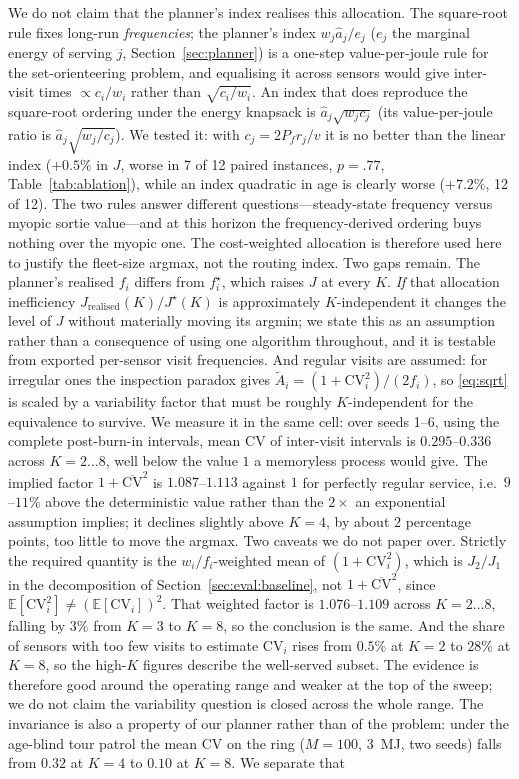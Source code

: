 \documentclass[journal,outdir=./]{IEEEtran}
\newcommand{\Pf}{P_{f}}
\begin{document}
We do not claim that the planner's index realises this allocation. The square-root rule fixes long-run \emph{frequencies}; the planner's index $w_j\hat a_j/e_j$ ($e_j$ the marginal energy of serving $j$, Section~\ref{sec:planner}) is a one-step value-per-joule rule for the set-orienteering problem, and equalising it across sensors would give inter-visit times $\propto c_i/w_i$ rather than $\sqrt{c_i/w_i}$. An index that does reproduce the square-root ordering under the energy knapsack is $\hat a_j\sqrt{w_jc_j}$ (its value-per-joule ratio is $\hat a_j\sqrt{w_j/c_j}$). We tested it: with $c_j=2\Pf r_j/v$ it is no better than the linear index ($+0.5\%$ in $J$, worse in 7 of 12 paired instances, $p=.77$, Table~\ref{tab:ablation}), while an index quadratic in age is clearly worse ($+7.2\%$, 12 of 12). The two rules answer different questions---steady-state frequency versus myopic sortie value---and at this horizon the frequency-derived ordering buys nothing over the myopic one. The cost-weighted allocation is therefore used here to justify the fleet-size argmax, not the routing index. Two gaps remain. The planner's realised $f_i$ differs from $f_i^{\star}$, which raises $J$ at every $K$. \emph{If} that allocation inefficiency $J_{\mathrm{realised}}(K)/J^{\star}(K)$ is approximately $K$-independent it changes the level of $J$ without materially moving its argmin; we state this as an assumption rather than a consequence of using one algorithm throughout, and it is testable from exported per-sensor visit frequencies. And regular visits are assumed: for irregular ones the inspection paradox gives $\tilde A_i=(1+\mathrm{CV}_i^2)/(2f_i)$, so \eqref{eq:sqrt} is scaled by a variability factor that must be roughly $K$-independent for the equivalence to survive. We measure it in the same cell: over seeds 1--6, using the complete post-burn-in intervals, mean $\mathrm{CV}$ of inter-visit intervals is $0.295$--$0.336$ across $K=2\ldots8$, well below the value $1$ a memoryless process would give. The implied factor $1+\overline{\mathrm{CV}}^2$ is $1.087$--$1.113$ against $1$ for perfectly regular service, i.e.\ $9$--$11\%$ above the deterministic value rather than the $2\times$ an exponential assumption implies; it declines slightly above $K=4$, by about $2$ percentage points, too little to move the argmax. Two caveats we do not paper over. Strictly the required quantity is the $w_i/f_i$-weighted mean of $(1+\mathrm{CV}_i^2)$, which is $J_2/J_1$ in the decomposition of Section~\ref{sec:eval:baseline}, not $1+\overline{\mathrm{CV}}^2$, since $\mathbb{E}[\mathrm{CV}_i^2]\neq(\mathbb{E}[\mathrm{CV}_i])^2$. That weighted factor is $1.076$--$1.109$ across $K=2\ldots8$, falling by $3\%$ from $K=3$ to $K=8$, so the conclusion is the same. And the share of sensors with too few visits to estimate $\mathrm{CV}_i$ rises from $0.5\%$ at $K=2$ to $28\%$ at $K=8$, so the high-$K$ figures describe the well-served subset. The evidence is therefore good around the operating range and weaker at the top of the sweep; we do not claim the variability question is closed across the whole range. The invariance is also a property of our planner rather than of the problem: under the age-blind tour patrol the mean CV on the ring ($M=100$, 3~MJ, two seeds) falls from $0.32$ at $K=4$ to $0.10$ at $K=8$. We separate that 
\end{document}
